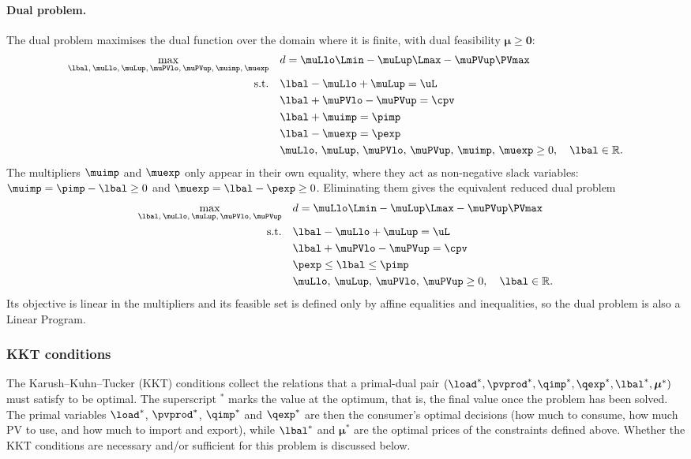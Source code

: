 \paragraph{Dual problem.}
The dual problem maximises the dual function over the domain where it is finite, with dual
feasibility $\boldsymbol{\mu} \geq \mathbf{0}$:
\begin{align}
    \max_{\lbal,\, \muLlo,\, \muLup,\, \muPVlo,\, \muPVup,\, \muimp,\, \muexp} \quad
    & d = \muLlo \Lmin - \muLup \Lmax - \muPVup \PVmax \\
    \text{s.t.} \quad
    & \lbal - \muLlo + \muLup = \uL \\
    & \lbal + \muPVlo - \muPVup = \cpv \\
    & \lbal + \muimp = \pimp \\
    & \lbal - \muexp = \pexp \\
    & \muLlo,\, \muLup,\, \muPVlo,\, \muPVup,\, \muimp,\, \muexp \geq 0, \quad
      \lbal \in \mathbb{R}.
\end{align}
The multipliers $\muimp$ and $\muexp$ only appear in their own equality, where they act as
non-negative slack variables: $\muimp = \pimp - \lbal \geq 0$ and $\muexp = \lbal - \pexp
\geq 0$. Eliminating them gives the equivalent reduced dual problem
\begin{align}
    \max_{\lbal,\, \muLlo,\, \muLup,\, \muPVlo,\, \muPVup} \quad
    & d = \muLlo \Lmin - \muLup \Lmax - \muPVup \PVmax \label{eq:dual_reduced} \\
    \text{s.t.} \quad
    & \lbal - \muLlo + \muLup = \uL \\
    & \lbal + \muPVlo - \muPVup = \cpv \\
    & \pexp \leq \lbal \leq \pimp \label{eq:dual_lambda_bounds} \\
    & \muLlo,\, \muLup,\, \muPVlo,\, \muPVup \geq 0, \quad \lbal \in \mathbb{R}.
\end{align}
Its objective is linear in the multipliers and its feasible set is defined only by affine
equalities and inequalities, so the dual problem is also a Linear Program.

\subsubsection{KKT conditions}
The Karush--Kuhn--Tucker (KKT) conditions collect the relations that a primal-dual pair
$({\load}^*, {\pvprod}^*, {\qimp}^*, {\qexp}^*, {\lbal}^*, \boldsymbol{\mu}^*)$ must satisfy to be
optimal. The superscript $^*$ marks the value at the optimum, that is, the final value once the
problem has been solved. The primal variables ${\load}^*$, ${\pvprod}^*$, ${\qimp}^*$ and
${\qexp}^*$ are then the consumer's optimal decisions (how much to consume, how much PV to use,
and how much to import and export), while ${\lbal}^*$ and $\boldsymbol{\mu}^*$ are the optimal
prices of the constraints defined above. Whether the KKT conditions are necessary and/or
sufficient for this problem is discussed below.

